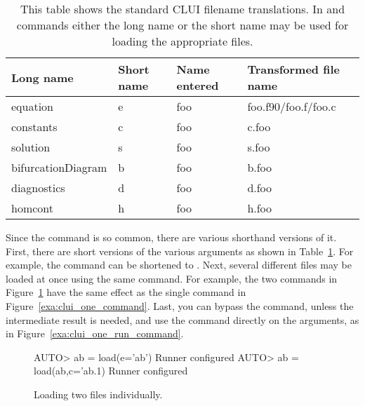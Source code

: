\documentclass[12pt]{report}
\begin{document}
 \begin{table}[htbp]
 \begin{center}
 \begin{tabular}{| l | l | l | l |}
 \hline
 Long name & Short name & Name entered & Transformed file name \\
 \hline
 equation  & e          & foo          &foo.f90/foo.f/foo.c \\
 \hline
 constants  & c          & foo          & c.foo \\
 \hline
 solution  & s          & foo          & s.foo \\
 \hline
 bifurcationDiagram  & b          & foo          &b.foo \\
 \hline
 diagnostics  & d          & foo          &d.foo \\
 \hline
 homcont  & h          & foo          &h.foo \\
 \hline
 \end{tabular}
 \caption[Standard \AUTO CLUI filename translations.]
 {This table shows the standard \AUTO CLUI filename
 translations.  In  and 
 commands either the long name or the short name may be
 used for loading the appropriate files.}
 \label{tbl:clui_filename_translation}
 \end{center}
 \end{table}

 Since the  command is so common, there are
 various shorthand versions of it.  First, there are short versions
 of the various arguments as shown in Table~\ref{tbl:clui_filename_translation}.
 For example, the command  can 
 be shortened to .
 Next, several different
 files may be loaded at once using the same  command.
 For example, the two commands in Figure~\ref{exa:clui_two_command}
 have the same effect as the single command in 
 Figure~\ref{exa:clui_one_command}.
 Last, you can bypass the  command, unless the
 intermediate result is needed, and use the  command
 directly on the  arguments, as in
 Figure~\ref{exa:clui_one_run_command}.

 \begin{figure}[htbp]
 {\small \begin{center} \begin{boxedverbatim}
 AUTO> ab = load(e='ab')
 Runner configured
 AUTO> ab = load(ab,c='ab.1)
 Runner configured
 \end{boxedverbatim}
 \end{center} 
 }
 \caption[Loading two files individually]
 {Loading two files individually.}
 \label{exa:clui_two_command}
 \end{figure}
\end{document}
